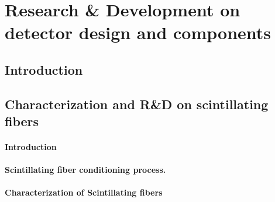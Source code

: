 \documentclass[12pt,a4paper]{book}
\begin{document}
\chapter[Research \& Development]{Research \& Development on detector design and components}\label{chap:ResearchandDevelopment}
	\section{Introduction}
	 \label{sec:IntroCharacterisation}
	\newpage
	
	\section[Characetrization fibers]{Characterization and R\&D on scintillating fibers}
	
		\subsubsection{Introduction}%
		\label{subsubsec:IntroFibersResults}
		
		\subsubsection[Conditioning process]{Scintillating fiber conditioning process.}%
		\label{subsubsec:ConditioningProcess}
		
		
		\subsubsection{Characterization of Scintillating fibers}%
		\label{subsubsec:SiPM}
		
\end{document}
